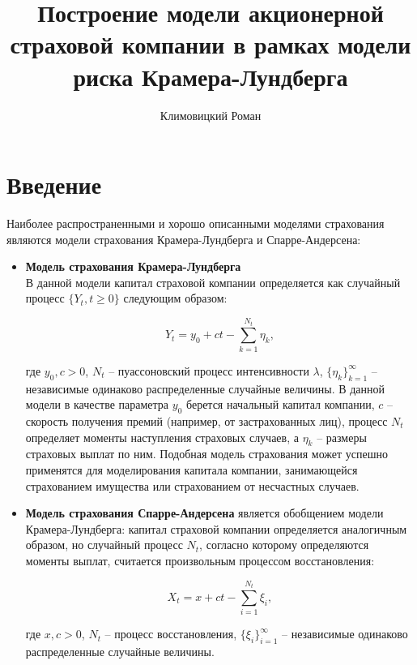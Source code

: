\documentclass{article}
\title{Построение модели акционерной страховой компании в рамках модели риска Крамера-Лундберга}
\author{Климовицкий Роман}
\theoremstyle{plain}
\theoremstyle{plain}
\theoremstyle{plain}
\theoremstyle{plain}
\theoremstyle{definition}
\theoremstyle{remark}
\begin{document}
\maketitle

\large

\section{Введение}

Наиболее распространенными и хорошо описанными моделями страхования являются модели страхования Крамера-Лундберга и Спарре-Андерсена:

\begin{itemize}
    \item \textbf{Модель страхования Крамера-Лундберга} \\
    В данной модели капитал страховой компании определяется как случайный процесс $\{Y_t, t \geq 0\}$ следующим образом:

    \begin{equation}
    \label{Kramer-Lundberg}
        Y_t = y_0 + ct - \displaystyle \sum_{k = 1}^{N_t} \eta_k,
    \end{equation}
    
    где $y_0, c > 0$, $N_t$ -- пуассоновский процесс интенсивности $\lambda$, $\{\eta_k\}_{k = 1}^{\infty}$ -- независимые одинаково распределенные случайные величины. В данной модели в качестве параметра $y_0$ берется начальный капитал компании, $c$ -- скорость получения премий (например, от застрахованных лиц), процесс $N_t$ определяет моменты наступления страховых случаев, а $\eta_k$ -- размеры страховых выплат по ним. Подобная модель страхования может успешно применятся для моделирования капитала компании, занимающейся страхованием имущества или страхованием от несчастных случаев.

    \item \textbf{Модель страхования Спарре-Андерсена} \cite{Sparre-Andersen} является обобщением модели Крамера-Лундберга: капитал страховой компании определяется аналогичным образом, но случайный процесс $N_t$, согласно которому определяются моменты выплат, считается произвольным процессом восстановления:
    
    \begin{equation}
    \label{Sparre-Andersen}
        X_t = x + ct - \displaystyle \sum_{i = 1}^{N_t} \xi_i,
    \end{equation}
    
    где $x, c > 0$, $N_t$ -- процесс восстановления, $\{\xi_i\}_{i = 1}^{\infty}$ -- независимые одинаково распределенные случайные величины.
\end{itemize}
 
\end{document}
